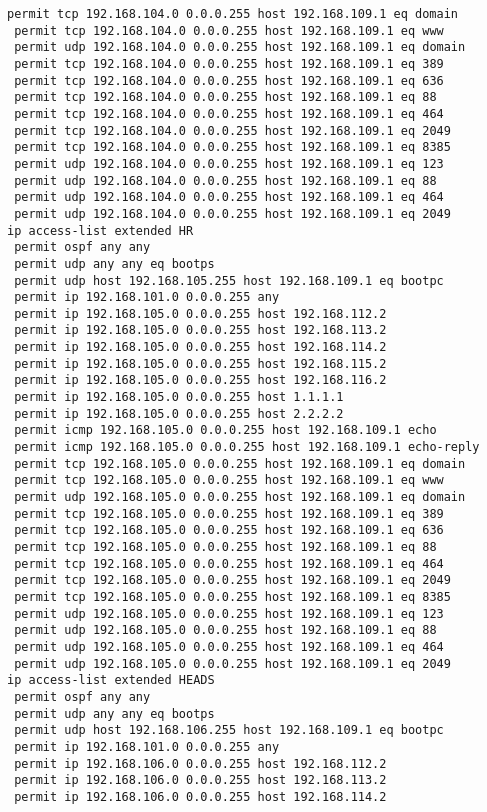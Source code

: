 \documentclass[14pt, a4paper]{extarticle}
\begin{document}
\begin{appendices}
\begin{lstlisting}[caption=Конфигурация устройства SW\_1\_L3\_IVANOV\label{list:conf_sw1_l3}]
 permit tcp 192.168.104.0 0.0.0.255 host 192.168.109.1 eq domain
 permit tcp 192.168.104.0 0.0.0.255 host 192.168.109.1 eq www
 permit udp 192.168.104.0 0.0.0.255 host 192.168.109.1 eq domain
 permit tcp 192.168.104.0 0.0.0.255 host 192.168.109.1 eq 389
 permit tcp 192.168.104.0 0.0.0.255 host 192.168.109.1 eq 636
 permit tcp 192.168.104.0 0.0.0.255 host 192.168.109.1 eq 88
 permit tcp 192.168.104.0 0.0.0.255 host 192.168.109.1 eq 464
 permit tcp 192.168.104.0 0.0.0.255 host 192.168.109.1 eq 2049
 permit tcp 192.168.104.0 0.0.0.255 host 192.168.109.1 eq 8385
 permit udp 192.168.104.0 0.0.0.255 host 192.168.109.1 eq 123
 permit udp 192.168.104.0 0.0.0.255 host 192.168.109.1 eq 88
 permit udp 192.168.104.0 0.0.0.255 host 192.168.109.1 eq 464
 permit udp 192.168.104.0 0.0.0.255 host 192.168.109.1 eq 2049
ip access-list extended HR
 permit ospf any any
 permit udp any any eq bootps
 permit udp host 192.168.105.255 host 192.168.109.1 eq bootpc
 permit ip 192.168.101.0 0.0.0.255 any
 permit ip 192.168.105.0 0.0.0.255 host 192.168.112.2
 permit ip 192.168.105.0 0.0.0.255 host 192.168.113.2
 permit ip 192.168.105.0 0.0.0.255 host 192.168.114.2
 permit ip 192.168.105.0 0.0.0.255 host 192.168.115.2
 permit ip 192.168.105.0 0.0.0.255 host 192.168.116.2
 permit ip 192.168.105.0 0.0.0.255 host 1.1.1.1
 permit ip 192.168.105.0 0.0.0.255 host 2.2.2.2
 permit icmp 192.168.105.0 0.0.0.255 host 192.168.109.1 echo
 permit icmp 192.168.105.0 0.0.0.255 host 192.168.109.1 echo-reply
 permit tcp 192.168.105.0 0.0.0.255 host 192.168.109.1 eq domain
 permit tcp 192.168.105.0 0.0.0.255 host 192.168.109.1 eq www
 permit udp 192.168.105.0 0.0.0.255 host 192.168.109.1 eq domain
 permit tcp 192.168.105.0 0.0.0.255 host 192.168.109.1 eq 389
 permit tcp 192.168.105.0 0.0.0.255 host 192.168.109.1 eq 636
 permit tcp 192.168.105.0 0.0.0.255 host 192.168.109.1 eq 88
 permit tcp 192.168.105.0 0.0.0.255 host 192.168.109.1 eq 464
 permit tcp 192.168.105.0 0.0.0.255 host 192.168.109.1 eq 2049
 permit tcp 192.168.105.0 0.0.0.255 host 192.168.109.1 eq 8385
 permit udp 192.168.105.0 0.0.0.255 host 192.168.109.1 eq 123
 permit udp 192.168.105.0 0.0.0.255 host 192.168.109.1 eq 88
 permit udp 192.168.105.0 0.0.0.255 host 192.168.109.1 eq 464
 permit udp 192.168.105.0 0.0.0.255 host 192.168.109.1 eq 2049
ip access-list extended HEADS
 permit ospf any any
 permit udp any any eq bootps
 permit udp host 192.168.106.255 host 192.168.109.1 eq bootpc
 permit ip 192.168.101.0 0.0.0.255 any
 permit ip 192.168.106.0 0.0.0.255 host 192.168.112.2
 permit ip 192.168.106.0 0.0.0.255 host 192.168.113.2
 permit ip 192.168.106.0 0.0.0.255 host 192.168.114.2

\end{lstlisting}
\end{appendices}
\end{document}
